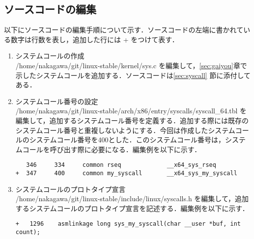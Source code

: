 \documentclass[12pt]{jsarticle}
\begin{document}
\subsection{ソースコードの編集}\label{sec:hensyuu}
以下にソースコードの編集手順について示す．ソースコードの左端に書かれている数字は行数を表し，追加した行には + をつけて表す．
  \begin{enumerate}
  \item システムコールの作成\\    
    /home/nakagawa/git/linux-stable/kernel/sys.c を編集して，\ref{sec:gaiyou}章で示したシステムコールを追加する．ソースコードは\ref{sec:syscall} 節に添付してある．
  \item システムコール番号の設定\\
    /home/nakagawa/git/linux-stable/arch/x86/entry/syscalls/syscall\_64.tbl を編集して，追加するシステムコール番号を定義する．追加する際には既存のシステムコール番号と重複しないようにする．今回は作成したシステムコールのシステムコール番号を400とした．このシステムコール番号は，システムコールを呼び出す際に必要になる．編集例を以下に示す．
    
\begin{verbatim}
   346     334     common rseq             __x64_sys_rseq
+  347     400     common my_syscall       __x64_sys_my_syscall
\end{verbatim}

\item システムコールのプロトタイプ宣言\\  
  /home/nakagawa/git/linux-stable/include/linux/syscalls.h を編集して，追加するシステムコールのプロトタイプ宣言を記述する．編集例を以下に示す．
\begin{verbatim}
+   1296    asmlinkage long sys_my_syscall(char __user *buf, int count);
\end{verbatim}
  \end{enumerate}
  
\end{document}
